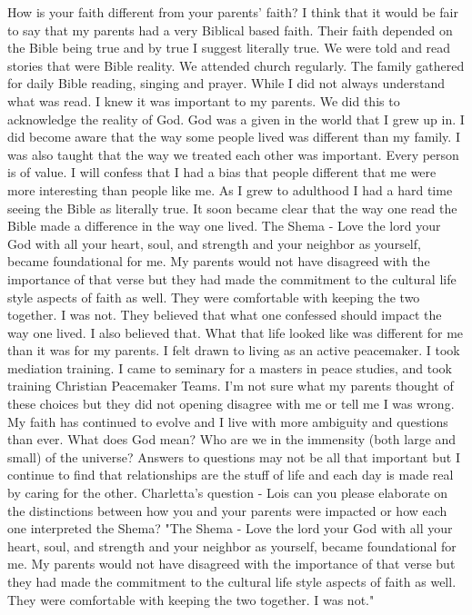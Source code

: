 How is your faith different from your parents' faith?
I think that it would be fair to say that my parents had a very Biblical based faith. Their faith depended on the Bible being true and by true I suggest literally true. We were told and read stories that were Bible reality. We attended church regularly. The family gathered for daily Bible reading, singing and prayer. While I did not always understand what was read. I knew it was important to my parents. We did this to acknowledge the reality of God. God was a given in the world that I grew up in. I did become aware that the way some people lived was different than my family. I was also taught that the way we treated each other was important. Every person is of value. I will confess that I had a bias that people different that me were more interesting than people like me. 
As I grew to adulthood I had a hard time seeing the Bible as literally true. It soon became clear that the way one read the Bible made a difference in the way one lived. The Shema - Love the lord your God with all your heart, soul, and strength and your neighbor as yourself, became foundational for me. My parents would not have disagreed with the importance of that verse but they had made the commitment to the cultural life style aspects of faith as well. They were comfortable with keeping the two together. I was not. 
They believed that what one confessed should impact the way one lived. I also believed that. What that life looked like was different for me than it was for my parents. I felt drawn to living as an active peacemaker. I took mediation training. I came to seminary for a masters in peace studies, and took training Christian Peacemaker Teams. I'm not sure what my parents thought of these choices but they did not opening disagree with me or tell me I was wrong. 
My faith has continued to evolve and I live with more ambiguity and questions than ever. What does God mean? Who are we in the immensity (both large and small) of the universe? Answers to questions may not be all that important but I continue to find that relationships are the stuff of life and each day is made real by caring for the other. 
Charletta's question - Lois can you please elaborate on the distinctions between how you and your parents were impacted or how each one interpreted the Shema?
"The Shema - Love the lord your God with all your heart, soul, and strength and your neighbor as yourself, became foundational for me. My parents would not have disagreed with the importance of that verse but they had made the commitment to the cultural life style aspects of faith as well. They were comfortable with keeping the two together. I was not."
